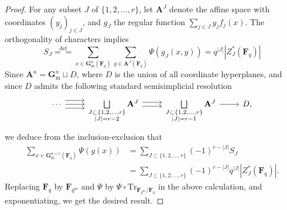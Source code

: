 \documentclass{amsart}
\numberwithin{equation}{section}
\theoremstyle{plain}
\theoremstyle{definition}
\renewcommand{\mathbb}{\mathbf}
\renewcommand{\setminus}{\mathbin{\rule[0.2em]{0.67em}{0.12em}}}%
\begin{document}
\begin{proof}
  For any subset \(J\) of \(\{1,2,\ldots,r\}\),
  let \(\mathbb{A}^{J}\) denote the affine space with coordinates
  \((y_{j})_{j\in J}\), and \(g_{J}\) the regular function
  \(\sum_{j\in J}y_{j}f_{j}(x)\).
  The orthogonality of characters implies
  \[
    S_{J}
    \overset{\text{def}}{=\!=}
    \sum\limits_{x\in \mathbb{G}_{\mathrm{m}}^{n}(\mathbb{F}_q)}\sum_{y\in\mathbb{A}^{J}(\mathbb{F}_q)}
    \Psi(g_{J}(x,y)) =q^{|J|}|Z^*_{J}(\mathbb{F}_q)| \]
Since \(\mathbb{A}^{n} = \mathbb{G}_{\mathrm{m}}^{n} \sqcup D\), where \(D\) is
  the union of all coordinate hyperplanes, and since \(D\) admits the following
  standard semisimplicial resolution
  \begin{equation*}
    \begin{tikzcd}
      \cdots \ar[r,shift left=2] \ar[r] \ar[r,shift right=2]&
      \bigsqcup\limits_{\substack{J\subset \{1,2,\ldots,r\} \\ |J| = r-2}} \mathbb{A}^{J} \ar[r,shift left] \ar[r,shift right] & \bigsqcup\limits_{\substack{J\subset \{1,2,\ldots,r\} \\ |J| = r-1}}\mathbb{A}^{J} \ar[r] &D,
    \end{tikzcd}
  \end{equation*}
  we deduce from the inclusion-exclusion that
  \begin{align*}
    \sum_{x\in \mathbb{G}_{\mathrm{m}}^{n+r}(\mathbb{F}_q)}\Psi(g(x))
    &= \sum_{J\subset \{1,2,\ldots,r\}}(-1)^{r-|J|} S_J\\
    &= \sum_{J\subset \{1,2,\ldots,r\}}
      (-1)^{r-|J|}q^{|J|} |Z_{J}^*(\mathbb{F}_q)|.
  \end{align*}
  Replacing \(\mathbb{F}_q\) by \(\mathbb{F}_{q^m}\) and  \(\Psi\) by \(\Psi\circ \mathrm{Tr}_{\mathbb{F}_{q^m}/\mathbb{F}_q}\) in the above calculation,
  and exponentiating,
  we get the desired result.
\end{proof}
\end{document}
